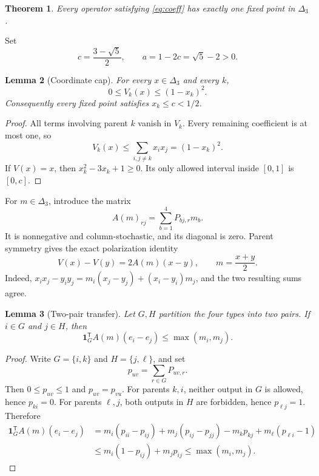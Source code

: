 \documentclass[11pt]{amsart}
\newtheorem{theorem}{Theorem}[section]
\newtheorem{lemma}[theorem]{Lemma}
\theoremstyle{definition}
\newcommand{\D}{\Delta_3}
\newcommand{\one}{\mathbf 1}
\begin{document}
\begin{theorem}\label{thm:unique}
Every operator satisfying \eqref{eq:coeff} has exactly one fixed point in $\D$.
\end{theorem}

Set
\begin{equation}\label{eq:c}
 c=\frac{3-\sqrt5}{2},\qquad a=1-2c=\sqrt5-2>0.
\end{equation}

\begin{lemma}[Coordinate cap]\label{lem:cap}
For every $x\in\D$ and every $k$,
\[
 0\le V_k(x)\le(1-x_k)^2.
\]
Consequently every fixed point satisfies $x_k\le c<1/2$.
\end{lemma}
\begin{proof}
All terms involving parent $k$ vanish in $V_k$. Every remaining coefficient is at most one, so
\[
 V_k(x)\le\sum_{i,j\ne k}x_ix_j=(1-x_k)^2.
\]
If $V(x)=x$, then $x_k^2-3x_k+1\ge0$. Its only allowed interval inside $[0,1]$ is $[0,c]$.
\end{proof}

For $m\in\D$, introduce the matrix
\begin{equation}\label{eq:A}
 A(m)_{rj}=\sum_{b=1}^4P_{bj,r}m_b.
\end{equation}
It is nonnegative and column-stochastic, and its diagonal is zero. Parent symmetry gives the exact polarization identity
\begin{equation}\label{eq:polar}
 V(x)-V(y)=2A(m)(x-y),\qquad m=\frac{x+y}{2}.
\end{equation}
Indeed, $x_ix_j-y_iy_j=m_i(x_j-y_j)+(x_i-y_i)m_j$, and the two resulting sums agree.

\begin{lemma}[Two-pair transfer]\label{lem:transfer}
Let $G,H$ partition the four types into two pairs. If $i\in G$ and $j\in H$, then
\begin{equation}\label{eq:transfer}
 \one_G^{\mathsf T}A(m)(e_i-e_j)\le\max(m_i,m_j).
\end{equation}
\end{lemma}
\begin{proof}
Write $G=\{i,k\}$ and $H=\{j,\ell\}$, and set
\[
 p_{uv}=\sum_{r\in G}P_{uv,r}.
\]
Then $0\le p_{uv}\le1$ and $p_{uv}=p_{vu}$. For parents $k,i$, neither output in $G$ is allowed, hence $p_{ki}=0$. For parents $\ell,j$, both outputs in $H$ are forbidden, hence $p_{\ell j}=1$. Therefore
\begin{align*}
 \one_G^{\mathsf T}A(m)(e_i-e_j)
 &=m_i(p_{ii}-p_{ij})+m_j(p_{ij}-p_{jj})
      -m_kp_{kj}+m_\ell(p_{\ell i}-1)\\
 &\le m_i(1-p_{ij})+m_jp_{ij}
 \le\max(m_i,m_j).
\end{align*}
\end{proof}
\end{document}
